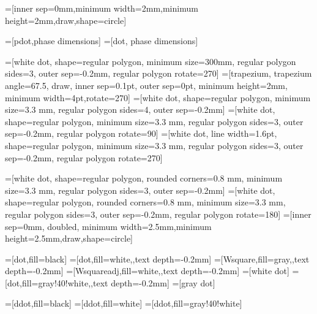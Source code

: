 
=[inner sep=0mm,minimum width=2mm,minimum height=2mm,draw,shape=circle]

=[pdot,phase dimensions]
=[dot, phase dimensions]

=[white dot, shape=regular polygon, minimum size=300mm, regular polygon sides=3, outer sep=-0.2mm, regular polygon rotate=270]
=[trapezium, trapezium angle=67.5, draw, inner sep=0.1pt, outer sep=0pt, minimum height=2mm, minimum width=4pt,rotate=270]
=[white dot, shape=regular polygon, minimum size=3.3 mm, regular polygon sides=4, outer sep=-0.2mm]
=[white dot, shape=regular polygon, minimum size=3.3 mm, regular polygon sides=3, outer sep=-0.2mm, regular polygon rotate=90]
=[white dot, line width=1.6pt, shape=regular polygon, minimum size=3.3 mm, regular polygon sides=3, outer sep=-0.2mm, regular polygon rotate=270]

=[white dot, shape=regular polygon, rounded corners=0.8 mm, minimum size=3.3 mm, regular polygon sides=3, outer sep=-0.2mm]
=[white dot, shape=regular polygon, rounded corners=0.8 mm, minimum size=3.3 mm, regular polygon sides=3, outer sep=-0.2mm, regular polygon rotate=180]
=[inner sep=0mm, doubled, minimum width=2.5mm,minimum height=2.5mm,draw,shape=circle]

=[dot,fill=black]
=[dot,fill=white,,text depth=-0.2mm]
=[Wsquare,fill=gray,,text depth=-0.2mm]
=[Wsquareadj,fill=white,,text depth=-0.2mm]
=[white dot] %
=[dot,fill=gray!40!white,,text depth=-0.2mm]
=[gray dot] %


=[ddot,fill=black]
=[ddot,fill=white]
=[ddot,fill=gray!40!white]


